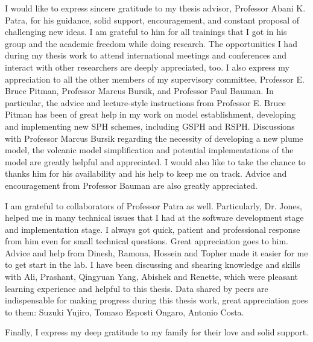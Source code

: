 I would like to express sincere gratitude to my thesis advisor, Professor Abani K. Patra, for his guidance, solid support, encouragement, and constant proposal of challenging new ideas. I am grateful to him for all trainings that I got in his group and the academic freedom while doing research. The opportunities I had during my thesis work to attend international meetings and conferences and interact with other researchers are deeply appreciated, too.
I also express my appreciation to all the other members of my supervisory committee, Professor E. Bruce Pitman, Professor Marcus Bursik, and Professor Paul Bauman. In particular, the advice
and lecture-style instructions from Professor E. Bruce Pitman has been of great help in my work on model establishment, developing and implementing new SPH schemes, including GSPH and RSPH. Discussions with Professor Marcus Bursik regarding the necessity of developing a new plume model, the volcanic model simplification and potential implementations of the model are greatly helpful and appreciated. I would also like to take the chance to thanks him for his availability and his help to keep me on track. Advice and encouragement from Professor Bauman are also greatly appreciated.

I am grateful to collaborators of Professor Patra as well. Particularly, Dr. Jones, helped me in many technical issues that I had at the software development stage and implementation stage. I always got quick, patient and professional response from him even for small technical questions. Great appreciation goes to him. Advice and help from Dinesh, Ramona, Hossein and Topher made it easier for me to get start in the lab. I have been discussing and shearing knowledge and skills with Ali, Prashant, Qingyuan Yang, Abishek and Renette, which were pleasant learning experience and helpful to this thesis. Data shared by peers are indispensable for making progress during this thesis work, great appreciation goes to them: Suzuki Yujiro, Tomaso Esposti Ongaro, Antonio Costa.
 
Finally, I express my deep gratitude to my family for their love and solid support.